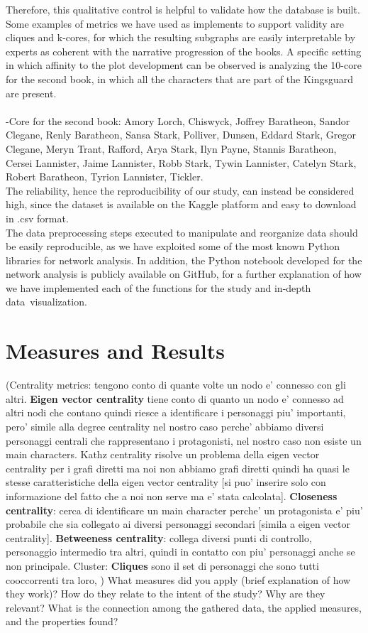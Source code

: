 \documentclass[12pt, a4paper]{article}
\begin{document}
Therefore, this qualitative control is helpful to validate how the database is built.
Some examples of metrics we have used as implements to support validity are cliques and k-cores, for which the resulting subgraphs are easily interpretable by experts as coherent with the narrative progression of the books.
A specific setting in which affinity to the plot development can be observed is analyzing the 10-core for the second book, in which all the characters that are part of the Kingsguard are present. \\
\\
{\fontsize{8}{11}-Core for the second book: Amory Lorch, Chiswyck, Joffrey Baratheon, Sandor Clegane, Renly Baratheon, Sansa Stark, Polliver, Dunsen, Eddard Stark, Gregor Clegane, Meryn Trant, Rafford, Arya Stark, Ilyn Payne, Stannis Baratheon, Cersei Lannister, Jaime Lannister, Robb Stark, Tywin Lannister, Catelyn Stark, Robert Baratheon, Tyrion Lannister, Tickler.}
\\

The reliability, hence the reproducibility of our study, can instead be considered high, since the dataset is available on the Kaggle platform and easy to download in .csv format.\\ 
The data preprocessing steps executed to manipulate and reorganize data should be easily reproducible, as we have exploited some of the most known Python libraries for network analysis. 
In addition, the Python notebook developed for the network analysis is publicly available on GitHub, for a further explanation of how we have implemented each of the functions for the study and in-depth data visualization.
\section{Measures and Results}
\label{measures}
(Centrality metrics: tengono conto di quante volte un nodo e' connesso con gli altri. \textbf{Eigen vector centrality} tiene conto di quanto un nodo e' connesso ad altri nodi che contano quindi riesce a identificare i personaggi piu' importanti, pero' simile alla degree centrality nel nostro caso perche' abbiamo diversi personaggi centrali che rappresentano i protagonisti, nel nostro caso non esiste un main characters. Kathz centrality risolve un problema della eigen vector centrality per i grafi diretti ma noi non abbiamo grafi diretti quindi ha quasi le stesse caratteristiche della eigen vector centrality [si puo' inserire solo con informazione del fatto che a noi non serve ma e' stata calcolata].
\textbf{Closeness centrality}: cerca di identificare un main character perche' un protagonista e' piu' probabile che sia collegato ai diversi personaggi secondari [simila a eigen vector centrality].
\textbf{Betweeness centrality}: collega diversi punti di controllo, personaggio intermedio tra altri, quindi in contatto con piu' personaggi anche se non principale.
\medskip
Cluster: \textbf{Cliques} sono il set di personaggi che sono tutti cooccorrenti tra loro, )
What measures did you apply (brief explanation of how they work)? How do
they relate to the intent of the study? Why are they relevant? What is the connection among the gathered data, the applied measures,
and the properties found?
\end{document}
